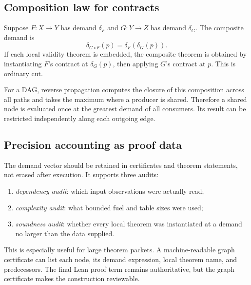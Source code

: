 \subsection{Composition law for contracts}

Suppose \(F:X\to Y\) has demand \(\delta_F\) and \(G:Y\to Z\) has demand
\(\delta_G\).  The composite demand is
\[
 \delta_{G\circ F}(p)=\delta_F(\delta_G(p)).
\]
If each local validity theorem is embedded, the composite theorem is obtained
by instantiating \(F\)'s contract at \(\delta_G(p)\), then applying \(G\)'s
contract at \(p\).  This is ordinary cut.

For a DAG, reverse propagation computes the closure of this composition across
all paths and takes the maximum where a producer is shared.  Therefore a
shared node is evaluated once at the greatest demand of all consumers.  Its
result can be restricted independently along each outgoing edge.

\subsection{Precision accounting as proof data}

The demand vector should be retained in certificates and theorem statements,
not erased after execution.  It supports three audits:

\begin{enumerate}
\item \emph{dependency audit}: which input observations were actually read;
\item \emph{complexity audit}: what bounded fuel and table sizes were used;
\item \emph{soundness audit}: whether every local theorem was instantiated at
a demand no larger than the data supplied.
\end{enumerate}

This is especially useful for large theorem packets.  A machine-readable graph
certificate can list each node, its demand expression, local theorem name, and
predecessors.  The final Lean proof term remains authoritative, but the graph
certificate makes the construction reviewable.
